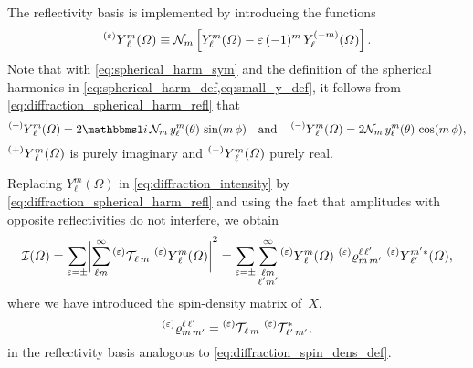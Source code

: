 The reflectivity basis is implemented by introducing the functions
\begin{equation}
  \label{eq:diffraction_spherical_harm_refl}
  \prescript{(\refl)}{}{Y}_\ell^m(\Omega)
  \equiv \mathcal{N}_m \sBrk[2]{Y_\ell^m(\Omega) - \refl\, (-1)^m\, Y_\ell^{(-m)}(\Omega)}.
\end{equation}
Note that with \cref{eq:spherical_harm_sym} and the definition of the
spherical harmonics in \cref{eq:spherical_harm_def,eq:small_y_def}, it
follows from \cref{eq:diffraction_spherical_harm_refl} that
\begin{equation}
  \prescript{(+)}{}{Y}_\ell^m(\Omega)
  = 2 \imag\, \mathcal{N}_m\, y_\ell^m(\theta)\, \sin(m\, \phi)
  \quad\text{and}\quad
  \prescript{(-)}{}{Y}_\ell^m(\Omega)
  = 2 \mathcal{N}_m\, y_\ell^m(\theta)\, \cos(m\, \phi),
\end{equation}
\ie $\prescript{(+)}{}{Y}_\ell^m(\Omega)$ is purely imaginary and
$\prescript{(-)}{}{Y}_\ell^m(\Omega)$ purely real.

Replacing $Y_\ell^m(\Omega)$ in \cref{eq:diffraction_intensity} by
\cref{eq:diffraction_spherical_harm_refl} and using the fact that
amplitudes with opposite reflectivities do not interfere, we obtain
\begin{equation}
  \label{eq:diffraction_intensity_refl}
  \mathcal{I}(\Omega)
  = \sum_{\refl = \pm} \Abs[3]{\sum_{\ell m}^\infty \prescript{(\refl)}{}{\mathcal{T}}_{\!\ell\, m}\, \prescript{(\refl)}{}{Y}_\ell^m(\Omega)}^2
  = \sum_{\refl = \pm} \sum_{\substack{\ell m \\ \ell' m'}}^\infty
  \prescript{(\refl)}{}{Y}_\ell^m(\Omega)\, \prescript{(\refl)}{}{\varrho}^{\ell\, \ell'}_{m\, m'}\, \prescript{(\refl)}{}{Y}_{\ell'}^{m' *}(\Omega),
\end{equation}
where we have introduced the spin-density matrix of~$X$,
\begin{equation}
  \label{eq:diffraction_refl_spin-dens}
  \prescript{(\ensuremath{\varepsilon})}{}{\varrho}^{\ell\, \ell'}_{m\, m'}
  = \prescript{(\ensuremath{\varepsilon})}{}{\mathcal{T}}_{\!\ell\, m}\, \prescript{(\ensuremath{\varepsilon})}{}{\mathcal{T}}_{\!\ell'\, m'}^*,
\end{equation}
in the reflectivity basis analogous to
\cref{eq:diffraction_spin_dens_def}.

